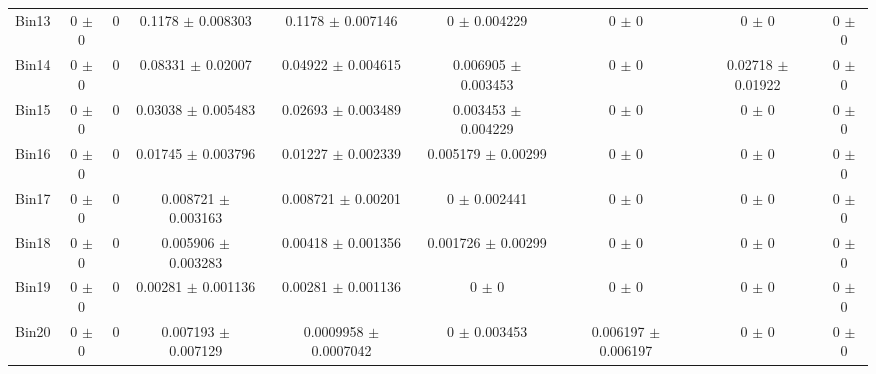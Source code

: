 \begin{tabular}{@{\extracolsep{4pt}}lcccccccc@{}}
     Bin13 & 0 $\pm$ 0 & 0 & 0.1178 $\pm$ 0.008303 & 0.1178 $\pm$ 0.007146 & 0 $\pm$ 0.004229 & 0 $\pm$ 0 & 0 $\pm$ 0 & 0 $\pm$ 0 \\ 
     Bin14 & 0 $\pm$ 0 & 0 & 0.08331 $\pm$ 0.02007 & 0.04922 $\pm$ 0.004615 & 0.006905 $\pm$ 0.003453 & 0 $\pm$ 0 & 0.02718 $\pm$ 0.01922 & 0 $\pm$ 0 \\ 
     Bin15 & 0 $\pm$ 0 & 0 & 0.03038 $\pm$ 0.005483 & 0.02693 $\pm$ 0.003489 & 0.003453 $\pm$ 0.004229 & 0 $\pm$ 0 & 0 $\pm$ 0 & 0 $\pm$ 0 \\ 
     Bin16 & 0 $\pm$ 0 & 0 & 0.01745 $\pm$ 0.003796 & 0.01227 $\pm$ 0.002339 & 0.005179 $\pm$ 0.00299 & 0 $\pm$ 0 & 0 $\pm$ 0 & 0 $\pm$ 0 \\ 
     Bin17 & 0 $\pm$ 0 & 0 & 0.008721 $\pm$ 0.003163 & 0.008721 $\pm$ 0.00201 & 0 $\pm$ 0.002441 & 0 $\pm$ 0 & 0 $\pm$ 0 & 0 $\pm$ 0 \\ 
     Bin18 & 0 $\pm$ 0 & 0 & 0.005906 $\pm$ 0.003283 & 0.00418 $\pm$ 0.001356 & 0.001726 $\pm$ 0.00299 & 0 $\pm$ 0 & 0 $\pm$ 0 & 0 $\pm$ 0 \\ 
     Bin19 & 0 $\pm$ 0 & 0 & 0.00281 $\pm$ 0.001136 & 0.00281 $\pm$ 0.001136 & 0 $\pm$ 0 & 0 $\pm$ 0 & 0 $\pm$ 0 & 0 $\pm$ 0 \\ 
     Bin20 & 0 $\pm$ 0 & 0 & 0.007193 $\pm$ 0.007129 & 0.0009958 $\pm$ 0.0007042 & 0 $\pm$ 0.003453 & 0.006197 $\pm$ 0.006197 & 0 $\pm$ 0 & 0 $\pm$ 0 \\ 
\hline\hline
  \end{tabular}

